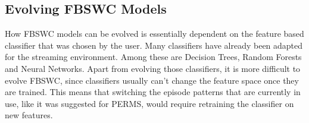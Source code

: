 \subsection{Evolving FBSWC Models}
\label{subsec_evolvingFBSWC}
How FBSWC models can be evolved is essentially dependent on the feature based classifier that was chosen by the user. Many classifiers have already been adapted for the streaming environment. Among these are Decision Trees, Random Forests and Neural Networks. Apart from evolving those classifiers, it is more difficult to evolve FBSWC, since classifiers usually can't change the feature space once they are trained. This means that switching the episode patterns that are currently in use, like it was suggested for PERMS, would require retraining the classifier on new features.